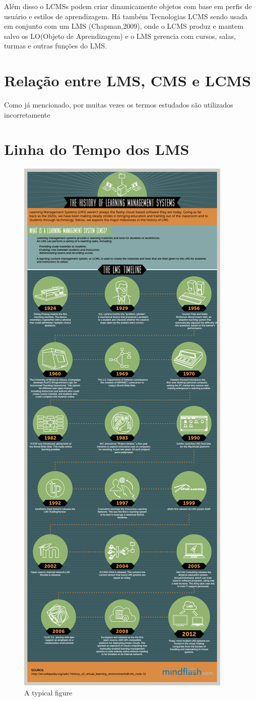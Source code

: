 \documentclass[12pt]{article}
\begin{document}
Além disso o LCMSs podem criar dinamicamente objetos com base em perfis de usuário e estilos de aprendizagem. Há também Tecnologias LCMS sendo 
usada em conjunto com um LMS (Chapman,2009), onde o LCMS produz e mantem salvo os LO(Objeto de Aprendizagem) e o LMS gerencia com cursos, salas, 
turmas e outras funções do LMS.

\section{Relação entre LMS, CMS e LCMS}
 
Como já mencionado, por muitas vezes os termos estudados são utilizados incorretamente




\newpage
\appendix
\section{Linha do Tempo dos LMS}

\begin{figure}[ht]
\centering
\includegraphics[width=.55\textwidth]{history-of-lms.png}
\caption{A typical figure}
\label{fig:exampleFig1}
\end{figure}
\end{document}
